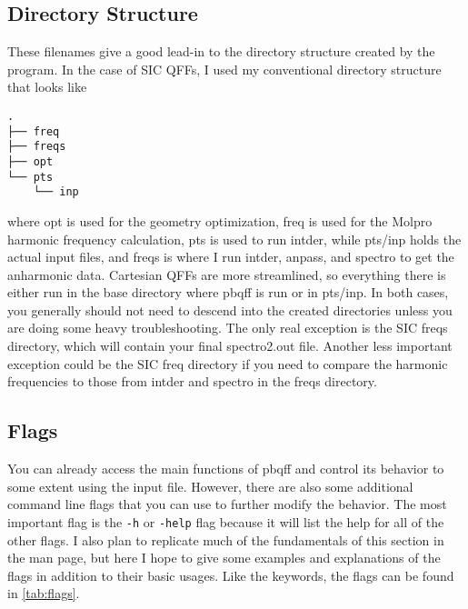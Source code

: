 \documentclass{article}
\begin{document}
\subsection{Directory Structure}

These filenames give a good lead-in to the directory structure created
by the program. In the case of SIC QFFs, I used my conventional
directory structure that looks like

\begin{verbatim}
.
├── freq
├── freqs
├── opt
└── pts
    └── inp
\end{verbatim}

\noindent
where opt is used for the geometry optimization, freq is used for the
Molpro harmonic frequency calculation, pts is used to run intder,
while pts/inp holds the actual input files, and freqs is where I run
intder, anpass, and spectro to get the anharmonic data. Cartesian QFFs
are more streamlined, so everything there is either run in the base
directory where pbqff is run or in pts/inp. In both cases, you
generally should not need to descend into the created directories
unless you are doing some heavy troubleshooting. The only real
exception is the SIC freqs directory, which will contain your final
spectro2.out file. Another less important exception could be the SIC
freq directory if you need to compare the harmonic frequencies to
those from intder and spectro in the freqs directory.

\subsection{Flags}

You can already access the main functions of pbqff and control its
behavior to some extent using the input file. However, there are also
some additional command line flags that you can use to further modify
the behavior. The most important flag is the \verb|-h| or \verb|-help|
flag because it will list the help for all of the other flags. I also
plan to replicate much of the fundamentals of this section in the man
page, but here I hope to give some examples and explanations of the
flags in addition to their basic usages. Like the keywords, the flags
can be found in \autoref{tab:flags}.
\end{document}
